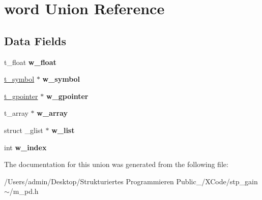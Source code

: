 \hypertarget{unionword}{}\section{word Union Reference}
\label{unionword}
\subsection*{Data Fields}
\begin{DoxyCompactItemize}
\item 
\mbox{\label{unionword_a3c5165bbd8505472fd8608dcb99b7ab9}} 
t\+\_\+float {\bfseries w\+\_\+float}
\item 
\mbox{\label{unionword_a89a95e26fb2b30ebe70204de2c3fa099}} 
\hyperlink{struct__symbol}{t\+\_\+symbol} $\ast$ {\bfseries w\+\_\+symbol}
\item 
\mbox{\label{unionword_a93fe0df3a2b3388336f6e71b55742d6c}} 
\hyperlink{struct__gpointer}{t\+\_\+gpointer} $\ast$ {\bfseries w\+\_\+gpointer}
\item 
\mbox{\label{unionword_af8427520e3abf9c0d26732a38056d6cb}} 
t\+\_\+array $\ast$ {\bfseries w\+\_\+array}
\item 
\mbox{\label{unionword_a849bfad495d86a401a0228015b90c9ac}} 
struct \+\_\+glist $\ast$ {\bfseries w\+\_\+list}
\item 
\mbox{\label{unionword_a985fdabd5996a0ae1ed311855f8e4be7}} 
int {\bfseries w\+\_\+index}
\end{DoxyCompactItemize}


The documentation for this union was generated from the following file\+:\begin{DoxyCompactItemize}
\item 
/\+Users/admin/\+Desktop/\+Strukturiertes Programmieren Public\+\_/\+X\+Code/stp\+\_\+gain$\sim$/m\+\_\+pd.\+h\end{DoxyCompactItemize}
